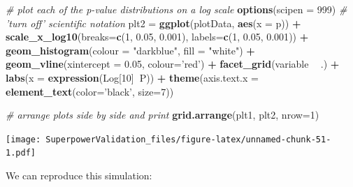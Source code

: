 \documentclass[]{book}
\newenvironment{Shaded}{\begin{snugshade}}{\end{snugshade}}
\newcommand{\CommentTok}[1]{\textcolor[rgb]{0.56,0.35,0.01}{\textit{#1}}}
\newcommand{\DataTypeTok}[1]{\textcolor[rgb]{0.13,0.29,0.53}{#1}}
\newcommand{\DecValTok}[1]{\textcolor[rgb]{0.00,0.00,0.81}{#1}}
\newcommand{\FloatTok}[1]{\textcolor[rgb]{0.00,0.00,0.81}{#1}}
\newcommand{\KeywordTok}[1]{\textcolor[rgb]{0.13,0.29,0.53}{\textbf{#1}}}
\newcommand{\NormalTok}[1]{#1}
\newcommand{\OperatorTok}[1]{\textcolor[rgb]{0.81,0.36,0.00}{\textbf{#1}}}
\newcommand{\StringTok}[1]{\textcolor[rgb]{0.31,0.60,0.02}{#1}}
\begin{document}
\begin{Shaded}
\begin{Highlighting}[]
\CommentTok{# plot each of the p-value distributions on a log scale}
\KeywordTok{options}\NormalTok{(}\DataTypeTok{scipen =} \DecValTok{999}\NormalTok{) }\CommentTok{# 'turn off' scientific notation}
\NormalTok{plt2 =}\StringTok{ }\KeywordTok{ggplot}\NormalTok{(plotData, }\KeywordTok{aes}\NormalTok{(}\DataTypeTok{x =}\NormalTok{ p)) }\OperatorTok{+}
\StringTok{    }\KeywordTok{scale_x_log10}\NormalTok{(}\DataTypeTok{breaks=}\KeywordTok{c}\NormalTok{(}\DecValTok{1}\NormalTok{, }\FloatTok{0.05}\NormalTok{, }\FloatTok{0.001}\NormalTok{), }
                  \DataTypeTok{labels=}\KeywordTok{c}\NormalTok{(}\DecValTok{1}\NormalTok{, }\FloatTok{0.05}\NormalTok{, }\FloatTok{0.001}\NormalTok{)) }\OperatorTok{+}
\StringTok{    }\KeywordTok{geom_histogram}\NormalTok{(}\DataTypeTok{colour =} \StringTok{"darkblue"}\NormalTok{, }\DataTypeTok{fill =} \StringTok{"white"}\NormalTok{) }\OperatorTok{+}
\StringTok{    }\KeywordTok{geom_vline}\NormalTok{(}\DataTypeTok{xintercept =} \FloatTok{0.05}\NormalTok{, }\DataTypeTok{colour=}\StringTok{'red'}\NormalTok{) }\OperatorTok{+}
\StringTok{    }\KeywordTok{facet_grid}\NormalTok{(variable }\OperatorTok{~}\StringTok{ }\NormalTok{.) }\OperatorTok{+}
\StringTok{    }\KeywordTok{labs}\NormalTok{(}\DataTypeTok{x =} \KeywordTok{expression}\NormalTok{(Log[}\DecValTok{10}\NormalTok{]}\OperatorTok{~}\NormalTok{P)) }\OperatorTok{+}
\StringTok{    }\KeywordTok{theme}\NormalTok{(}\DataTypeTok{axis.text.x =} \KeywordTok{element_text}\NormalTok{(}\DataTypeTok{color=}\StringTok{'black'}\NormalTok{, }\DataTypeTok{size=}\DecValTok{7}\NormalTok{))}
 
\CommentTok{# arrange plots side by side and print}
\KeywordTok{grid.arrange}\NormalTok{(plt1, plt2, }\DataTypeTok{nrow=}\DecValTok{1}\NormalTok{)}
\end{Highlighting}
\end{Shaded}

\texttt{[image: SuperpowerValidation\_files/figure-latex/unnamed-chunk-51-1.pdf]}

We can reproduce this simulation:
\end{document}
